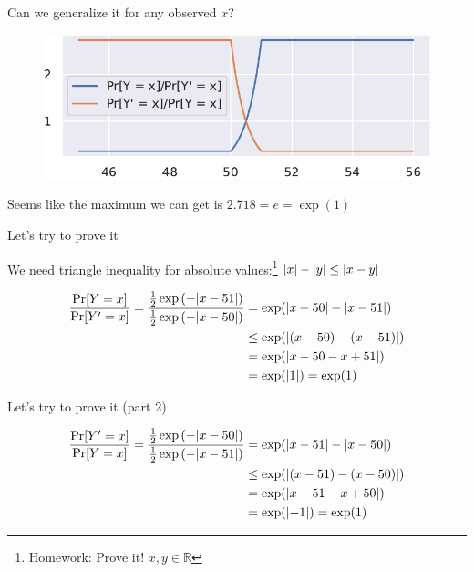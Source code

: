 \documentclass[12pt,aspectratio=169,handout]{beamer}
\begin{document}
\begin{frame}{Can we generalize it for any observed $x$?}

\begin{figure}
\centering
\includegraphics[width=0.8\linewidth]{img/laplace-03.pdf}
\end{figure}

Seems like the maximum we can get is $2.718 = e = \exp(1)$

\end{frame}


\begin{frame}{Let's try to prove it}

We need triangle inequality for absolute values:\footnote{Homework: Prove it! $x, y \in \mathbb{R}$}
$\abs{x} - \abs{y} \leq \abs{x - y}$

$$
\begin{aligned}
\frac{\Pr[Y = x]}{\Pr[Y' = x]} =
\frac{
\frac{1}{2} \exp \left(- \abs{x - 51} \right)
}{
\frac{1}{2} \exp \left(-\abs{x - 50} \right) 
}
&= \exp ( \abs{x - 50} - \abs{x - 51} ) \\
&\leq \exp ( \abs{(x - 50) - (x - 51)} ) \\
&= \exp ( \abs{x - 50 - x + 51} ) \\
&= \exp ( \abs{1}) = \exp(1) \\
\end{aligned}
$$

\end{frame}


\begin{frame}{Let's try to prove it (part 2)}


$$
\begin{aligned}
\frac{\Pr[Y' = x]}{\Pr[Y = x]} =
\frac{
	\frac{1}{2} \exp \left( - \abs{x - 50} \right)
}{
	\frac{1}{2} \exp \left( - \abs{x - 51} \right) 
}
&= \exp ( \abs{x - 51} - \abs{x - 50} ) \\
&\leq \exp ( \abs{(x - 51) - (x - 50)} ) \\
&= \exp ( \abs{x - 51 - x + 50} ) \\
&= \exp (\abs{-1}) = \exp(1)
\end{aligned}
$$



\end{frame}
\end{document}
